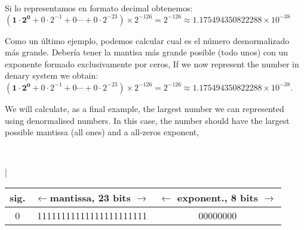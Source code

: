 \begin{paracol}{2}
Si lo representamos en formato decimal obtenemos: $(\mathbf{1\cdot2^0}+0\cdot2^{-1}+0\cdots+0\cdot2^{-23})\times 2^{-126}=2^{-126}\approx   1.175494350822288\times10^{-38}$

Como un último ejemplo, podemos calcular cual es el número desnormalizado más grande. Debería tener la mantisa más grande posible (todo unos) con un exponente formado exclusivamente por ceros,
\switchcolumn
If we now represent the number in denary system we obtain: $(\mathbf{1\cdot2^0}+0\cdot2^{-1}+0\cdots+0\cdot2^{-23})\times 2^{-126}=2^{-126}\approx   1.175494350822288\times10^{-38}$.

We will calculate, as a final example, the largest number we can represented using denormalised numbers. In this case, the number should have the largest possible mantissa (all ones) and a all-zeros exponent,    

\end{paracol}
\ \\
\begin{minipage}{\textwidth}
|\centering	
\begin{tabular}{|c||c||c|}
\hline
sig.&$\leftarrow$mantissa, 23 bits $\rightarrow$&$\leftarrow$ exponent., 8 bits $\rightarrow$\\
\hline
0&11111111111111111111111&00000000\\
\hline
\end{tabular}\\
\end{minipage}

